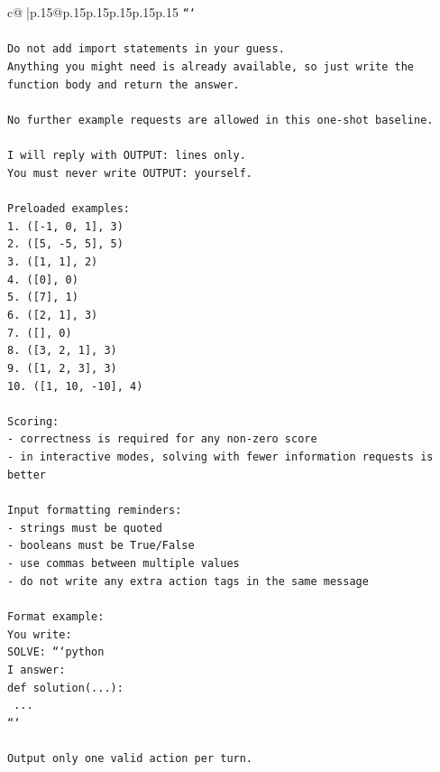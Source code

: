 \documentclass{article}
\begin{document}
{\begin{supertabular}{c@{$\;$}|p{.15\linewidth}@{}p{.15\linewidth}p{.15\linewidth}p{.15\linewidth}p{.15\linewidth}p{.15\linewidth}}
{{{\texttt{```} \\
\\ 
\texttt{Do not add import statements in your guess.} \\
\texttt{Anything you might need is already available, so just write the function body and return the answer.} \\
\\ 
\texttt{No further example requests are allowed in this one{-}shot baseline.} \\
\\ 
\texttt{I will reply with OUTPUT: lines only.} \\
\texttt{You must never write OUTPUT: yourself.} \\
\\ 
\texttt{Preloaded examples:} \\
\texttt{1. ({[}{-}1, 0, 1{]}, 3)} \\
\texttt{2. ({[}5, {-}5, 5{]}, 5)} \\
\texttt{3. ({[}1, 1{]}, 2)} \\
\texttt{4. ({[}0{]}, 0)} \\
\texttt{5. ({[}7{]}, 1)} \\
\texttt{6. ({[}2, 1{]}, 3)} \\
\texttt{7. ({[}{]}, 0)} \\
\texttt{8. ({[}3, 2, 1{]}, 3)} \\
\texttt{9. ({[}1, 2, 3{]}, 3)} \\
\texttt{10. ({[}1, 10, {-}10{]}, 4)} \\
\\ 
\texttt{Scoring:} \\
\texttt{{-} correctness is required for any non{-}zero score} \\
\texttt{{-} in interactive modes, solving with fewer information requests is better} \\
\\ 
\texttt{Input formatting reminders:} \\
\texttt{{-} strings must be quoted} \\
\texttt{{-} booleans must be True/False} \\
\texttt{{-} use commas between multiple values} \\
\texttt{{-} do not write any extra action tags in the same message} \\
\\ 
\texttt{Format example:} \\
\texttt{You write:} \\
\texttt{SOLVE: ```python} \\
\texttt{I answer:} \\
\texttt{def solution(...):} \\
\texttt{    ...} \\
\texttt{```} \\
\\ 
\texttt{Output only one valid action per turn.} \\
            }
        }
    }
     \\ \\


\end{supertabular}}
\end{document}
